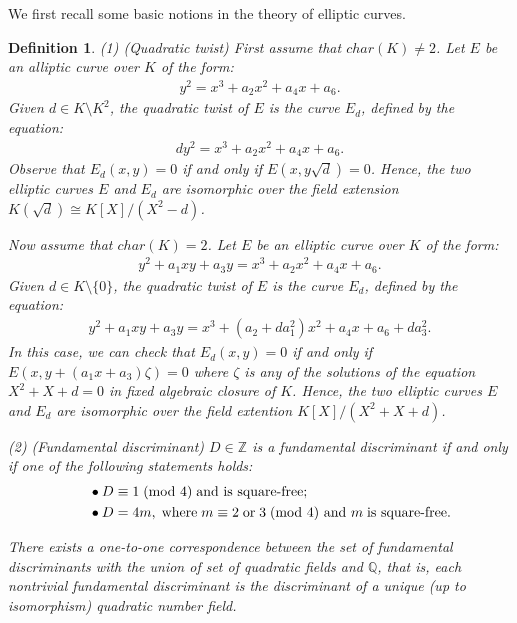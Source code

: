 \documentclass[12pt,reqno]{amsart}
\newtheorem{definition}[thm]{Definition}
\numberwithin{equation}{section}
\def\Z{{\mathbb Z}}
\def\Q{{\mathbb Q}}
\begin{document}
We first recall some basic notions in the theory of elliptic curves.

\begin{definition}
{\rm
(1) (Quadratic twist) First assume that $char(K) \neq 2$. Let $E$ be an alliptic curve over $K$ of the form:
\begin{align*}
y^2 = x^3 + a_2x^2 + a_4x + a_6.
\end{align*}
Given $d \in K\setminus K^2$, the quadratic twist of $E$ is the curve $E_d$, defined by the equation:
\begin{align*}
dy^2 = x^3 + a_2x^2 + a_4x + a_6.
\end{align*}
Observe that $E_d(x,y) = 0$ if and only if $E(x,y\sqrt{d}) = 0$. Hence, the two elliptic curves $E$ and $E_d$ are isomorphic over the field extension $K(\sqrt{d}) \cong K[X]/(X^2-d)$.

Now assume that $char(K) = 2$. Let $E$ be an elliptic curve over $K$ of the form:
\begin{align*}
y^2 + a_1xy + a_3y = x^3 + a_2x^2 + a_4x + a_6.
\end{align*}
Given $d \in K\setminus \{0\}$, the quadratic twist of $E$ is the curve $E_d$, defined by the equation:
\begin{align*}
y^2 + a_1xy + a_3y = x^3 + (a_2 + da_1^2)x^2 + a_4x + a_6 + da_3^2.
\end{align*}
In this case, we can check that $E_d(x,y) = 0$ if and only if $E(x, y+(a_1x+a_3)\zeta) =0$ where $\zeta$ is any of the solutions of the equation $X^2+X+d=0$ in fixed algebraic closure of $K$. Hence, the two elliptic curves $E$ and $E_d$ are isomorphic over the field extention $K[X]/(X^2+X+d)$.

\smallskip

(2) (Fundamental discriminant) $D \in \Z$ is a fundamental discriminant if and only if one of the following statements holds:
\begin{align*}
&\indent \bullet D \equiv 1 \; \text{(mod 4)} \; \text{and is square-free}; \\
&\indent \bullet D = 4m, \; \text{where} \; m \equiv 2 \; \text{or} \; 3 \; \text{(mod 4) and } m \; \text{is square-free}.
\end{align*}

There exists a one-to-one correspondence between the set of fundamental discriminants with the union of set of quadratic fields and $\Q$, that is, each nontrivial fundamental discriminant is the discriminant of a unique (up to isomorphism) quadratic number field.

}
\end{definition}
\end{document}
